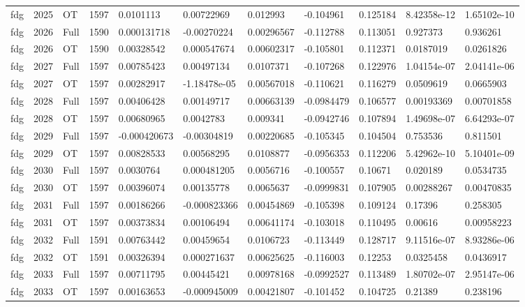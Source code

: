 \begin{landscape}
\begin{longtable}{lllllllllll}
fdg & 2025 & OT & 1597 & 0.0101113 & 0.00722969 & 0.012993 & -0.104961 & 0.125184 & 8.42358e-12 & 1.65102e-10 \\
fdg & 2026 & Full & 1590 & 0.000131718 & -0.00270224 & 0.00296567 & -0.112788 & 0.113051 & 0.927373 & 0.936261 \\
fdg & 2026 & OT & 1590 & 0.00328542 & 0.000547674 & 0.00602317 & -0.105801 & 0.112371 & 0.0187019 & 0.0261826 \\
fdg & 2027 & Full & 1597 & 0.00785423 & 0.00497134 & 0.0107371 & -0.107268 & 0.122976 & 1.04154e-07 & 2.04141e-06 \\
fdg & 2027 & OT & 1597 & 0.00282917 & -1.18478e-05 & 0.00567018 & -0.110621 & 0.116279 & 0.0509619 & 0.0665903 \\
fdg & 2028 & Full & 1597 & 0.00406428 & 0.00149717 & 0.00663139 & -0.0984479 & 0.106577 & 0.00193369 & 0.00701858 \\
fdg & 2028 & OT & 1597 & 0.00680965 & 0.0042783 & 0.009341 & -0.0942746 & 0.107894 & 1.49698e-07 & 6.64293e-07 \\
fdg & 2029 & Full & 1597 & -0.000420673 & -0.00304819 & 0.00220685 & -0.105345 & 0.104504 & 0.753536 & 0.811501 \\
fdg & 2029 & OT & 1597 & 0.00828533 & 0.00568295 & 0.0108877 & -0.0956353 & 0.112206 & 5.42962e-10 & 5.10401e-09 \\
fdg & 2030 & Full & 1597 & 0.0030764 & 0.000481205 & 0.0056716 & -0.100557 & 0.10671 & 0.020189 & 0.0534735 \\
fdg & 2030 & OT & 1597 & 0.00396074 & 0.00135778 & 0.0065637 & -0.0999831 & 0.107905 & 0.00288267 & 0.00470835 \\
fdg & 2031 & Full & 1597 & 0.00186266 & -0.000823366 & 0.00454869 & -0.105398 & 0.109124 & 0.17396 & 0.258305 \\
fdg & 2031 & OT & 1597 & 0.00373834 & 0.00106494 & 0.00641174 & -0.103018 & 0.110495 & 0.00616 & 0.00958223 \\
fdg & 2032 & Full & 1591 & 0.00763442 & 0.00459654 & 0.0106723 & -0.113449 & 0.128717 & 9.11516e-07 & 8.93286e-06 \\
fdg & 2032 & OT & 1591 & 0.00326394 & 0.000271637 & 0.00625625 & -0.116003 & 0.12253 & 0.0325458 & 0.0436917 \\
fdg & 2033 & Full & 1597 & 0.00711795 & 0.00445421 & 0.00978168 & -0.0992527 & 0.113489 & 1.80702e-07 & 2.95147e-06 \\
fdg & 2033 & OT & 1597 & 0.00163653 & -0.000945009 & 0.00421807 & -0.101452 & 0.104725 & 0.21389 & 0.238196 \\

\end{longtable}
\end{landscape}
